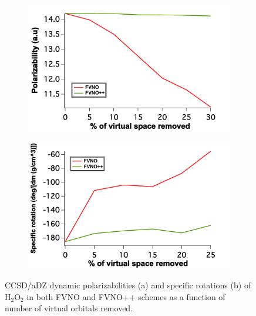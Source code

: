 \begin{figure}
\begin{subfigure}{.5\textwidth}
  \centering
  \includegraphics[width=.9\linewidth]{figures_fvno++/fvno++_h2o2_adz_polar.pdf}
  \caption{}
  \label{fig:sfig1}
\end{subfigure}%
\begin{subfigure}{.5\textwidth}
  \centering
  \includegraphics[width=.9\linewidth]{figures_fvno++/fvno++_h2o2_adz_optrot_lg.pdf}
  \caption{}
  \label{fig:sfig2}
\end{subfigure}
\caption{{\footnotesize CCSD/aDZ dynamic polarizabilities (a) and specific rotations (b) of H$_2$O$_2$ in both FVNO and FVNO++ schemes as a function of
number of virtual orbitals removed.}}
\label{fig:fvno++_h2o2_adz_polar_optrot_lg}
\end{figure}
